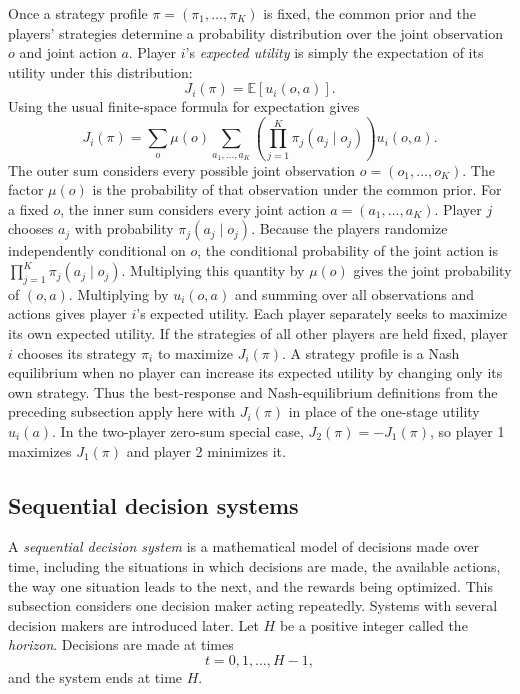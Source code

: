 Once a strategy profile $\pi=(\pi_1,\ldots,\pi_K)$ is fixed, the common prior and the players' strategies determine a probability distribution over the joint observation $o$ and joint action $a$. Player $i$'s \emph{expected utility} is simply the expectation of its utility under this distribution:
\[
    J_i(\pi)=\mathbb{E}[u_i(o,a)].
\]
Using the usual finite-space formula for expectation gives
\[
    J_i(\pi)
    =
    \sum_o\mu(o)
    \sum_{a_1,\ldots,a_K}
    \left(
      \prod_{j=1}^K\pi_j(a_j\mid o_j)
    \right)
    u_i(o,a).
\]
The outer sum considers every possible joint observation $o=(o_1,\ldots,o_K)$. The factor $\mu(o)$ is the probability of that observation under the common prior. For a fixed $o$, the inner sum considers every joint action $a=(a_1,\ldots,a_K)$. Player $j$ chooses $a_j$ with probability $\pi_j(a_j\mid o_j)$. Because the players randomize independently conditional on $o$, the conditional probability of the joint action is $\prod_{j=1}^K\pi_j(a_j\mid o_j)$. Multiplying this quantity by $\mu(o)$ gives the joint probability of $(o,a)$. Multiplying by $u_i(o,a)$ and summing over all observations and actions gives player $i$'s expected utility.
Each player separately seeks to maximize its own expected utility. If the strategies of all other players are held fixed, player $i$ chooses its strategy $\pi_i$ to maximize $J_i(\pi)$. A strategy profile is a Nash equilibrium when no player can increase its expected utility by changing only its own strategy. Thus the best-response and Nash-equilibrium definitions from the preceding subsection apply here with $J_i(\pi)$ in place of the one-stage utility $u_i(a)$. In the two-player zero-sum special case, $J_2(\pi)=-J_1(\pi)$, so player 1 maximizes $J_1(\pi)$ and player 2 minimizes it.


\subsection{Sequential decision systems}
\label{app:sequential-decisions}

A \emph{sequential decision system} is a mathematical model of decisions made over time, including the situations in which decisions are made, the available actions, the way one situation leads to the next, and the rewards being optimized. This subsection considers one decision maker acting repeatedly. Systems with several decision makers are introduced later. Let $H$ be a positive integer called the \emph{horizon}. Decisions are made at times
\[
    t=0,1,\ldots,H-1,
\]
and the system ends at time $H$.

